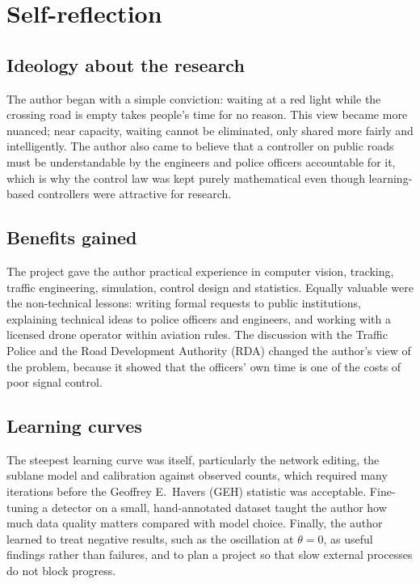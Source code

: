 \section{Self-reflection}

\subsection{Ideology about the research}

The author began with a simple conviction: waiting at a red light while the crossing road is empty takes people's time for no reason. This view became more nuanced; near capacity, waiting cannot be eliminated, only shared more fairly and intelligently. The author also came to believe that a controller on public roads must be understandable by the engineers and police officers accountable for it, which is why the control law was kept purely mathematical even though learning-based controllers were attractive for research.

\subsection{Benefits gained}

The project gave the author practical experience in computer vision, tracking, traffic engineering, simulation, control design and statistics. Equally valuable were the non-technical lessons: writing formal requests to public institutions, explaining technical ideas to police officers and engineers, and working with a licensed drone operator within aviation rules. The discussion with the Traffic Police and the Road Development Authority (RDA) changed the author's view of the problem, because it showed that the officers' own time is one of the costs of poor signal control.

\subsection{Learning curves}

The steepest learning curve was \sumo{} itself, particularly the network editing, the sublane model and calibration against observed counts, which required many iterations before the Geoffrey E.\ Havers (GEH) statistic was acceptable. Fine-tuning a detector on a small, hand-annotated dataset taught the author how much data quality matters compared with model choice. Finally, the author learned to treat negative results, such as the oscillation at $\theta=0$, as useful findings rather than failures, and to plan a project so that slow external processes do not block progress.

